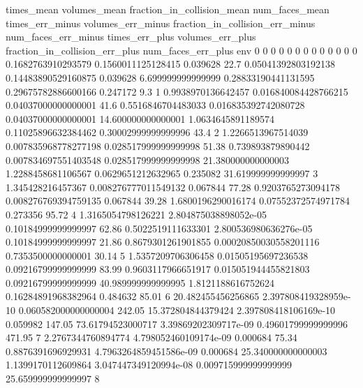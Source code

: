 times_mean	volumes_mean	fraction_in_collision_mean	num_faces_mean	times_err_minus	volumes_err_minus	fraction_in_collision_err_minus	num_faces_err_minus	times_err_plus	volumes_err_plus	fraction_in_collision_err_plus	num_faces_err_plus	env
0	0	0	0	0	0	0	0	0	0	0	0	0
0.1682763910293579	0.1560011125128415	0.039628	22.7	0.05041392803192138	0.14483890529160875	0.039628	6.699999999999999	0.28833190441131595	0.29675782886600166	0.247172	9.3	1
0.9938970136642457	0.016840084428766215	0.04037000000000001	41.6	0.5516846704483033	0.016835392742080728	0.04037000000000001	14.600000000000001	1.0634645891189574	0.11025896632384462	0.30002999999999996	43.4	2
1.2266513967514039	0.007835968778277198	0.028517999999999998	51.38	0.739893879890442	0.007834697551403548	0.028517999999999998	21.380000000000003	1.2288458681106567	0.0629651212632965	0.235082	31.619999999999997	3
1.345428216457367	0.008276777011549132	0.067844	77.28	0.9203765273094178	0.008276769394759135	0.067844	39.28	1.6800196290016174	0.07552372574971784	0.273356	95.72	4
1.3165054798126221	2.804875038898052e-05	0.10184999999999997	62.86	0.5022519111633301	2.800536980636276e-05	0.10184999999999997	21.86	0.8679301261901855	0.00020850030558201116	0.7353500000000001	30.14	5
1.5357209706306458	0.01505195697236538	0.09216799999999999	83.99	0.9603117966651917	0.015051944455821803	0.09216799999999999	40.989999999999995	1.8121188616752624	0.16284891968382964	0.484632	85.01	6
20.482455456256865	2.397808419328959e-10	0.060582000000000004	242.05	15.372804844379424	2.397808418106169e-10	0.059982	147.05	73.61794523000717	3.39869202309717e-09	0.49601799999999996	471.95	7
2.2767344760894774	4.798052460109174e-09	0.000684	75.34	0.8876391696929931	4.7963264859451586e-09	0.000684	25.340000000000003	1.1399170112609864	3.047447349120994e-08	0.009715999999999999	25.659999999999997	8
